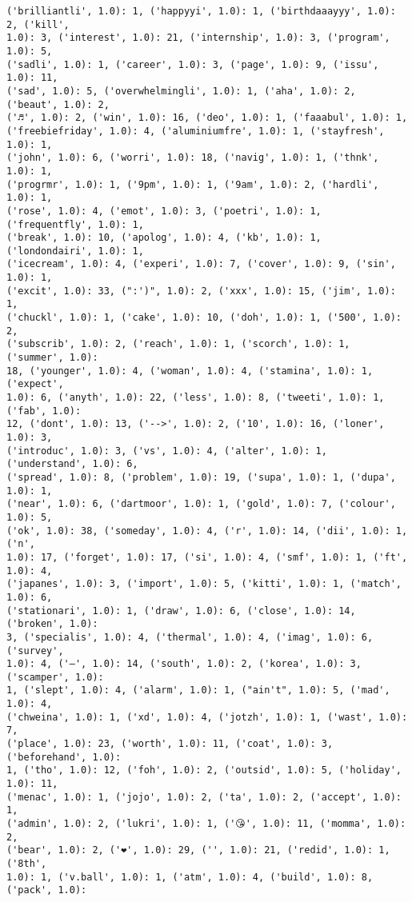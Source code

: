 \documentclass[11pt]{article}
\begin{document}
\begin{Verbatim}[commandchars=\\\{\}]
('brilliantli', 1.0): 1, ('happyyi', 1.0): 1, ('birthdaaayyy', 1.0): 2, ('kill',
1.0): 3, ('interest', 1.0): 21, ('internship', 1.0): 3, ('program', 1.0): 5,
('sadli', 1.0): 1, ('career', 1.0): 3, ('page', 1.0): 9, ('issu', 1.0): 11,
('sad', 1.0): 5, ('overwhelmingli', 1.0): 1, ('aha', 1.0): 2, ('beaut', 1.0): 2,
('♬', 1.0): 2, ('win', 1.0): 16, ('deo', 1.0): 1, ('faaabul', 1.0): 1,
('freebiefriday', 1.0): 4, ('aluminiumfre', 1.0): 1, ('stayfresh', 1.0): 1,
('john', 1.0): 6, ('worri', 1.0): 18, ('navig', 1.0): 1, ('thnk', 1.0): 1,
('progrmr', 1.0): 1, ('9pm', 1.0): 1, ('9am', 1.0): 2, ('hardli', 1.0): 1,
('rose', 1.0): 4, ('emot', 1.0): 3, ('poetri', 1.0): 1, ('frequentfly', 1.0): 1,
('break', 1.0): 10, ('apolog', 1.0): 4, ('kb', 1.0): 1, ('londondairi', 1.0): 1,
('icecream', 1.0): 4, ('experi', 1.0): 7, ('cover', 1.0): 9, ('sin', 1.0): 1,
('excit', 1.0): 33, (":')", 1.0): 2, ('xxx', 1.0): 15, ('jim', 1.0): 1,
('chuckl', 1.0): 1, ('cake', 1.0): 10, ('doh', 1.0): 1, ('500', 1.0): 2,
('subscrib', 1.0): 2, ('reach', 1.0): 1, ('scorch', 1.0): 1, ('summer', 1.0):
18, ('younger', 1.0): 4, ('woman', 1.0): 4, ('stamina', 1.0): 1, ('expect',
1.0): 6, ('anyth', 1.0): 22, ('less', 1.0): 8, ('tweeti', 1.0): 1, ('fab', 1.0):
12, ('dont', 1.0): 13, ('-->', 1.0): 2, ('10', 1.0): 16, ('loner', 1.0): 3,
('introduc', 1.0): 3, ('vs', 1.0): 4, ('alter', 1.0): 1, ('understand', 1.0): 6,
('spread', 1.0): 8, ('problem', 1.0): 19, ('supa', 1.0): 1, ('dupa', 1.0): 1,
('near', 1.0): 6, ('dartmoor', 1.0): 1, ('gold', 1.0): 7, ('colour', 1.0): 5,
('ok', 1.0): 38, ('someday', 1.0): 4, ('r', 1.0): 14, ('dii', 1.0): 1, ('n',
1.0): 17, ('forget', 1.0): 17, ('si', 1.0): 4, ('smf', 1.0): 1, ('ft', 1.0): 4,
('japanes', 1.0): 3, ('import', 1.0): 5, ('kitti', 1.0): 1, ('match', 1.0): 6,
('stationari', 1.0): 1, ('draw', 1.0): 6, ('close', 1.0): 14, ('broken', 1.0):
3, ('specialis', 1.0): 4, ('thermal', 1.0): 4, ('imag', 1.0): 6, ('survey',
1.0): 4, ('–', 1.0): 14, ('south', 1.0): 2, ('korea', 1.0): 3, ('scamper', 1.0):
1, ('slept', 1.0): 4, ('alarm', 1.0): 1, ("ain't", 1.0): 5, ('mad', 1.0): 4,
('chweina', 1.0): 1, ('xd', 1.0): 4, ('jotzh', 1.0): 1, ('wast', 1.0): 7,
('place', 1.0): 23, ('worth', 1.0): 11, ('coat', 1.0): 3, ('beforehand', 1.0):
1, ('tho', 1.0): 12, ('foh', 1.0): 2, ('outsid', 1.0): 5, ('holiday', 1.0): 11,
('menac', 1.0): 1, ('jojo', 1.0): 2, ('ta', 1.0): 2, ('accept', 1.0): 1,
('admin', 1.0): 2, ('lukri', 1.0): 1, ('😘', 1.0): 11, ('momma', 1.0): 2,
('bear', 1.0): 2, ('❤', 1.0): 29, ('️', 1.0): 21, ('redid', 1.0): 1, ('8th',
1.0): 1, ('v.ball', 1.0): 1, ('atm', 1.0): 4, ('build', 1.0): 8, ('pack', 1.0):

\end{Verbatim}
\end{document}
